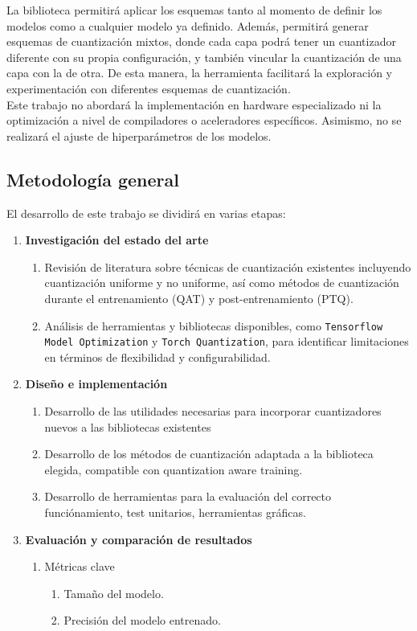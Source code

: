 \documentclass[a4paper,11pt, oneside]{article}
\begin{document}
La biblioteca permitirá aplicar los esquemas tanto al momento de definir los modelos como a cualquier modelo ya definido. Además, permitirá generar esquemas de cuantización mixtos, donde cada capa podrá tener un cuantizador diferente con su propia configuración, y también vincular la cuantización de una capa con la de otra. De esta manera, la herramienta facilitará la exploración y experimentación con diferentes esquemas de cuantización. \\

Este trabajo no abordará la implementación en hardware especializado ni la optimización a nivel de compiladores o aceleradores específicos. Asimismo, no se realizará el ajuste de hiperparámetros de los modelos. \\


\subsection*{Metodología general}
El desarrollo de este trabajo se dividirá en varias etapas:
\begin{enumerate}
    \item \textbf{Investigación del estado del arte}
    \begin{enumerate}
        \item Revisión de literatura sobre técnicas de cuantización existentes incluyendo cuantización uniforme y no uniforme, así como métodos de cuantización durante el entrenamiento (QAT) y post-entrenamiento (PTQ).
        \item Análisis de herramientas y bibliotecas disponibles, como \texttt{Tensorflow Model Optimization} y \texttt{Torch Quantization}, para identificar limitaciones en términos de flexibilidad y configurabilidad.
    \end{enumerate}
    \item \textbf{Diseño e implementación}
    \begin{enumerate}
        \item Desarrollo de las utilidades necesarias para incorporar cuantizadores nuevos a las bibliotecas existentes
        \item Desarrollo de los métodos de cuantización adaptada a la biblioteca elegida, compatible con quantization aware training.
        \item Desarrollo de herramientas para la evaluación del correcto funciónamiento, test unitarios, herramientas gráficas.
    \end{enumerate}
    \item \textbf{Evaluación y comparación de resultados}
    \begin{enumerate}
        \item {Métricas clave}
        \begin{enumerate}
            \item Tamaño del modelo.
            \item Precisión del modelo entrenado.
        \end{enumerate}
    \end{enumerate}
\end{enumerate}
\end{document}
